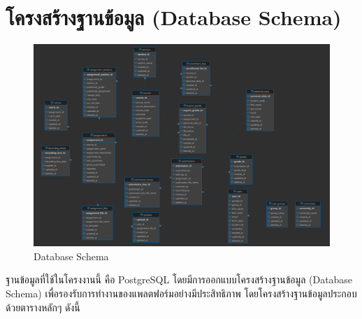 \section{โครงสร้างฐานข้อมูล (Database Schema)}
  \begin{figure}[!ht]
    \centering
    \includegraphics[width=1\textwidth]{image/Approach/Database-Schema.png}
    \caption[Database Schema]{Database Schema}
    \label{fig:database_schema}
  \end{figure}
  \FloatBarrier
  \qquad ฐานข้อมูลที่ใช้ในโครงงานนี้ คือ PostgreSQL โดยมีการออกแบบโครงสร้างฐานข้อมูล (Database Schema) เพื่อรองรับการทำงานของแพลตฟอร์มอย่างมีประสิทธิภาพ
  โดยโครงสร้างฐานข้อมูลประกอบด้วยตารางหลักๆ ดังนี้
